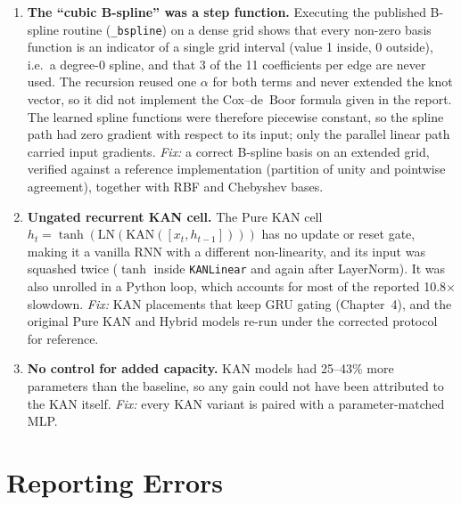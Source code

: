 \begin{enumerate}[leftmargin=*]
  \item \textbf{The ``cubic B-spline'' was a step function.}
        Executing the published B-spline routine (\texttt{\_bspline}) on a dense grid
        shows that every non-zero basis function is an indicator of a single
        grid interval (value 1 inside, 0 outside), i.e.\ a degree-0 spline, and
        that 3 of the 11 coefficients per edge are never used. The recursion
        reused one $\alpha$ for both terms and never extended the knot vector, so
        it did not implement the Cox--de~Boor formula given in the report.
        The learned spline functions were therefore piecewise constant, so the
        spline path had zero gradient with respect to its input; only the
        parallel linear path carried input gradients.
        \emph{Fix:} a correct B-spline basis on an extended grid, verified
        against a reference implementation (partition of unity and pointwise
        agreement), together with RBF and Chebyshev bases.

  \item \textbf{Ungated recurrent KAN cell.}
        The Pure KAN cell $h_t=\tanh(\mathrm{LN}(\mathrm{KAN}([x_t,h_{t-1}])))$
        has no update or reset gate, making it a vanilla RNN with a different
        non-linearity, and its input was squashed twice ($\tanh$ inside
        \texttt{KANLinear} and again after LayerNorm). It was also unrolled in a
        Python loop, which accounts for most of the reported 10.8$\times$
        slowdown.
        \emph{Fix:} KAN placements that keep GRU gating (Chapter~4), and the
        original Pure KAN and Hybrid models re-run under the corrected protocol
        for reference.

  \item \textbf{No control for added capacity.}
        KAN models had 25--43\% more parameters than the baseline, so any gain
        could not have been attributed to the KAN itself.
        \emph{Fix:} every KAN variant is paired with a parameter-matched MLP.
\end{enumerate}

\section{Reporting Errors}

